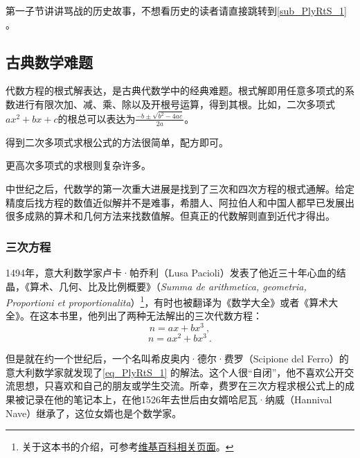 




第一子节讲讲骂战的历史故事，不想看历史的读者请直接跳转到\autoref{sub_PlyRtS_1} 。

\subsection{古典数学难题}

代数方程的根式解表达，是古典代数学中的经典难题。根式解即用任意多项式的系数进行有限次加、减、乘、除以及开根号运算，得到其根。比如，二次多项式$ax^2+bx+c$的根总可以表达为$\frac{-b\pm\sqrt{b^2-4ac}}{2a}$。

得到二次多项式求根公式的方法很简单，配方即可。

更高次多项式的求根则复杂许多。

中世纪之后，代数学的第一次重大进展是找到了三次和四次方程的根式通解。给定精度后找方程的数值近似解并不是难事，希腊人、阿拉伯人和中国人都早已发展出很多成熟的算术和几何方法来找数值解。但真正的代数解则直到近代才得出。

\subsubsection{三次方程}

1494年，意大利数学家卢卡·帕乔利（Lusa Pacioli）发表了他近三十年心血的结晶，《算术、几何、比及比例概要》（\textsl{Summa de arithmetica, geometria, Proportioni et proportionalita}）\footnote{关于这本书的介绍，可参考\href{https://en.wikipedia.org/wiki/Summa_de_arithmetica}{维基百科相关页面}。}，有时也被翻译为《数学大全》或者《算术大全》。在这本书里，他列出了两种无法解出的三次代数方程：
\begin{equation}\label{eq_PlyRtS_1}
n=ax+bx^3~,
\end{equation}
\begin{equation}\label{eq_PlyRtS_2}
n=ax^2+bx^3~.
\end{equation}

但是就在约一个世纪后，一个名叫希皮奥内·德尔·费罗（Scipione del Ferro）的意大利数学家就发现了\autoref{eq_PlyRtS_1} 的解法。这个人很“自闭”，他不喜欢公开交流思想，只喜欢和自己的朋友或学生交流。所幸，费罗在三次方程求根公式上的成果被记录在他的笔记本上，在他1526年去世后由女婿哈尼瓦·纳威（Hannival Nave）继承了，这位女婿也是个数学家。

